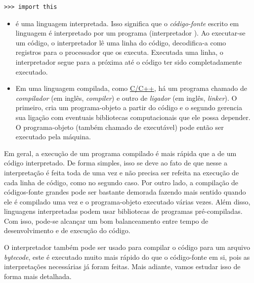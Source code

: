 \begin{lstlisting}
>>> import this
\end{lstlisting}

\begin{itemize}
\item {}

  {\python} é uma linguagem interpretada. Isso significa que o \emph{código-fonte} escrito em linguagem {\python} é interpretado por um programa (interpretador {\python}). Ao executar-se um código, o interpretador lê uma linha do código, decodifica-a como registros para o processador que os executa. Executada uma linha, o interpretador segue para a próxima até o código ter sido completadamente executado.

\item {}

  Em uma linguagem compilada, como \href{https://pt.wikipedia.org/wiki/C\%2B\%2B}{C/C++}, há um programa chamado de \emph{compilador} (em inglês, \textit{compiler}) e outro de \emph{ligador} (em inglês, \textit{linker}). O primeiro, cria um programa-objeto a partir do código e o segundo gerencia sua ligação com eventuais bibliotecas computacionais que ele possa depender. O programa-objeto (também chamado de executável) pode então ser executado pela máquina.
\end{itemize}

Em geral, a execução de um programa compilado é mais rápida que a de um código interpretado. De forma simples, isso se deve ao fato de que nesse a interpretação é feita toda de uma vez e não precisa ser refeita na execução de cada linha de código, como no segundo caso. Por outro lado, a compilação de códigos-fonte grandes pode ser bastante demorada fazendo mais sentido quando ele é compilado uma vez e o programa-objeto executado várias vezes. Além disso, linguagens interpretadas podem usar bibliotecas de programas pré-compiladas. Com isso, pode-se alcançar um bom balanceamento entre tempo de desenvolvimento e de execução do código.

O interpretador {\python} também pode ser usado para compilar o código para um arquivo \emph{bytecode}, este é executado muito mais rápido do que o código-fonte em si, pois as interpretações necessárias já foram feitas. Mais adiante, vamos estudar isso de forma mais detalhada.

\ifisbook
\newpage
\fi

